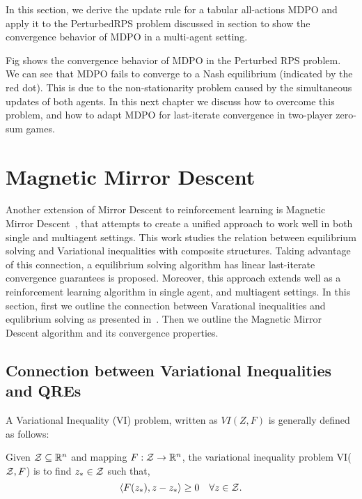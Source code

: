 In this section, we derive the update rule for a tabular all-actions MDPO and apply it to the PerturbedRPS problem discussed in section 
 to show 
the convergence behavior of MDPO in a multi-agent setting.


Fig  shows the convergence behavior of MDPO in the Perturbed RPS problem. 
We can see that MDPO fails to converge to a Nash equilibrium (indicated by the red dot).
This is due to the non-stationarity problem caused by the simultaneous updates of both agents.
In this next chapter we discuss how to overcome this problem, and how to adapt MDPO for last-iterate convergence in two-player zero-sum games.

\section[MMD]{Magnetic Mirror Descent}

Another extension of Mirror Descent to reinforcement learning is Magnetic Mirror Descent~\cite{sokotaUnified2023}, 
that attempts to create a unified approach to work well in both single and multiagent settings.
This work studies the relation between equilibrium solving and Variational inequalities with composite structures. 
Taking advantage of this connection, a equilibrium solving algorithm has linear last-iterate convergence guarantees is proposed. 
Moreover, this approach extends well as a reinforcement learning algorithm in single agent, and multiagent settings.
In this section, first we outline the connection between Varational inequalities and equlibrium solving as presented in~\cite{sokotaUnified2023}. 
Then we outline the Magnetic Mirror Descent algorithm and its convergence properties.

\subsection{Connection between Variational Inequalities and QREs}
A Variational Inequality (VI) problem, written as $VI(Z, F)$ is generally defined as follows:
\begin{definition}
	\label{def:vi}
	Given $\mathcal{Z}
		\subseteq \mathbb{R}^n$ and mapping $F: \mathcal{Z} \rightarrow \mathbb{R}^n$, the variational inequality problem VI($\mathcal{Z}, F$) 
		is to find $z_{\ast} \in \mathcal{Z}$ such that,
	\[ \langle F(z_{\ast}),
		z - z_{\ast} \rangle \geq 0 \quad \forall z \in \mathcal{Z}.
	\]
\end{definition}


